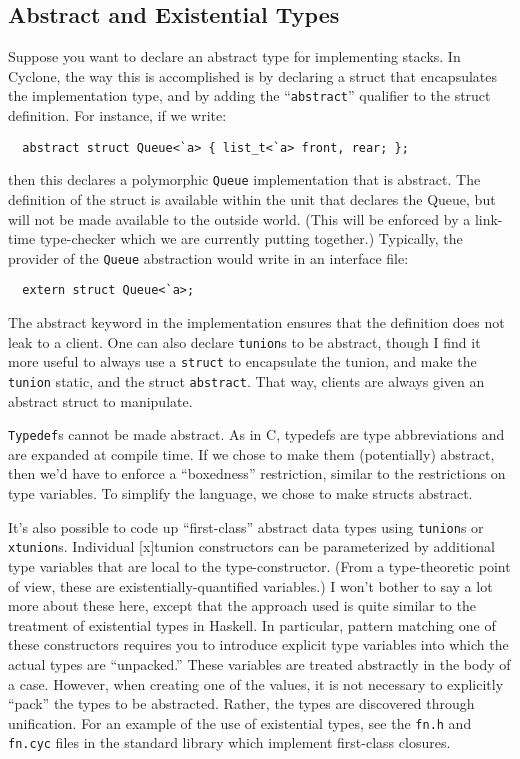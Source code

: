 \subsection{Abstract and Existential Types}
Suppose you want to declare an abstract type for implementing stacks.
In Cyclone, the way this is accomplished is by declaring a struct that
encapsulates the implementation type, and by adding the
``\texttt{abstract}'' qualifier to the struct definition.  For instance,
if we write:
\begin{verbatim}
  abstract struct Queue<`a> { list_t<`a> front, rear; };
\end{verbatim}
then this declares a polymorphic \texttt{Queue} implementation that is
abstract.  The definition of the struct is available within the unit
that declares the Queue, but will not be made available to the outside
world.  (This will be enforced by a link-time type-checker which we
are currently putting together.)  Typically, the provider of the
\texttt{Queue} abstraction would write in an interface file:
\begin{verbatim}
  extern struct Queue<`a>;
\end{verbatim}
The abstract keyword in the implementation ensures that the definition
does not leak to a client.  One can also declare \texttt{tunion}s to be
abstract, though I find it more useful to always use a \texttt{struct}
to encapsulate the tunion, and make the \texttt{tunion} static, and the
struct \texttt{abstract}.  That way, clients are always given an
abstract struct to manipulate.

\texttt{Typedef}s cannot be made abstract.  As in C, typedefs are type
abbreviations and are expanded at compile time.  If we chose to make
them (potentially) abstract, then we'd have to enforce a ``boxedness''
restriction, similar to the restrictions on type variables.  To
simplify the language, we chose to make structs abstract.

It's also possible to code up ``first-class'' abstract data types
using \texttt{tunion}s or \texttt{xtunion}s.  Individual [x]tunion
constructors can be parameterized by additional type variables that
are local to the type-constructor.  (From a type-theoretic point of
view, these are existentially-quantified variables.)  I won't bother
to say a lot more about these here, except that the approach used is
quite similar to the treatment of existential types in Haskell.  In
particular, pattern matching one of these constructors requires you to
introduce explicit type variables into which the actual types are
``unpacked.''  These variables are treated abstractly in the body of a
case.  However, when creating one of the values, it is not necessary
to explicitly ``pack'' the types to be abstracted.  Rather, the types
are discovered through unification.  For an example of the use of
existential types, see the \texttt{fn.h} and \texttt{fn.cyc} files in the
standard library which implement first-class closures.


